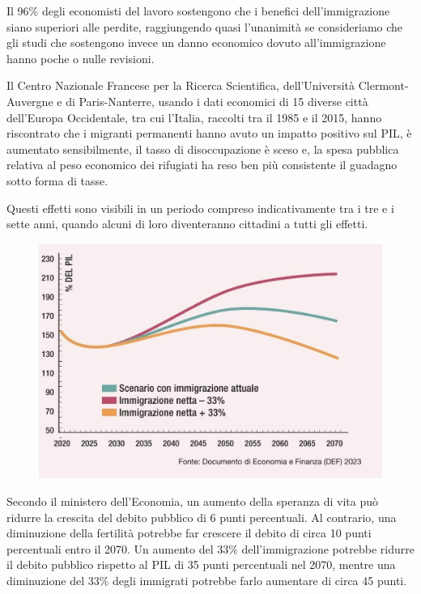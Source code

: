 \documentclass[12pt]{book} %
\begin{document}
Il 96\% degli economisti del lavoro sostengono che i benefici dell'immigrazione siano
superiori alle perdite, raggiungendo quasi
l'unanimità se consideriamo che gli studi che sostengono invece un danno economico dovuto
all'immigrazione hanno poche o nulle revisioni.

Il Centro Nazionale Francese per la Ricerca Scientifica, dell'Università Clermont-Auvergne e di Paris-Nanterre, usando i
dati economici di 15 diverse città dell'Europa Occidentale, tra cui l'Italia, raccolti tra il 1985
e il 2015, hanno riscontrato che i migranti permanenti hanno avuto un impatto
positivo sul PIL, è aumentato sensibilmente, il tasso di disoccupazione è sceso e, la
spesa pubblica relativa al peso economico dei rifugiati ha reso ben più consistente il guadagno sotto forma di
tasse.

Questi effetti sono visibili in un periodo compreso indicativamente tra i tre e i sette
anni, quando alcuni di loro diventeranno cittadini a tutti gli effetti.

\needspace{4cm}
\begin{figure}[H]
  \centering
  \includegraphics[width=0.95\linewidth]{images/Libro-img057.jpg}
\end{figure}

Secondo il ministero dell'Economia, un aumento della speranza di vita può ridurre la crescita del debito pubblico di 6 punti percentuali. Al contrario, una diminuzione della fertilità potrebbe far crescere il debito di circa 10 punti percentuali entro il 2070. Un aumento del 33\% dell'immigrazione potrebbe ridurre il debito pubblico rispetto al PIL di 35 punti percentuali nel 2070, mentre una diminuzione del 33\% degli immigrati potrebbe farlo aumentare di circa 45 punti.
\end{document}
